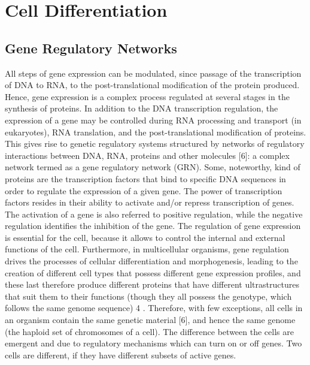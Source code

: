 \chapter{Cell Differentiation }\label{celldiff}
\lhead[\fancyplain{}{\bfseries\thepage}]{\fancyplain{}{\bfseries\rightmark}}


\section{Gene Regulatory Networks}

All steps of gene expression can be modulated, since passage of the transcription of DNA to RNA, to the post-translational modification of the protein
produced. Hence, gene expression is a complex process regulated at several stages in the synthesis of proteins. In addition to the DNA transcription regulation, the expression of a gene may be controlled during RNA processing and transport (in eukaryotes), RNA translation, and the post-translational modification of proteins. This gives rise to genetic regulatory systems structured by networks of regulatory interactions between DNA, RNA, proteins and other molecules [6]: a complex network termed as a gene regulatory
network (GRN). Some, noteworthy, kind of proteins are the transcription factors that bind to specific DNA sequences in order to regulate the
expression of a given gene. The power of transcription factors resides in their ability to activate and/or repress transcription of genes. The activation of
a gene is also referred to positive regulation, while the negative regulation
identifies the inhibition of the gene.
The regulation of gene expression is essential for the cell, because it
allows to control the internal and external functions of the cell. Furthermore,
in multicellular organisms, gene regulation drives the processes of cellular
differentiation and morphogenesis, leading to the creation of different cell
types that possess different gene expression profiles, and these last therefore
produce different proteins that have different ultrastructures that suit them
to their functions (though they all possess the genotype, which follows the
same genome sequence) 4 . Therefore, with few exceptions, all cells in an
organism contain the same genetic material [6], and hence the same genome
(the haploid set of chromosomes of a cell). The difference between the cells
are emergent and due to regulatory mechanisms which can turn on or off
genes. Two cells are different, if they have different subsets of active genes.


